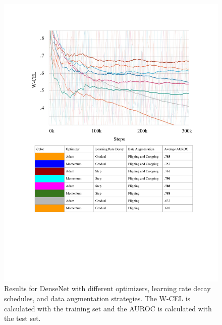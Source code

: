 \documentclass{article}
\begin{document}
\begin{figure}[p]
\vskip 0.2in
\begin{center}
\centerline{\includegraphics[width=\columnwidth]{figure_3A}}
\caption{Results for DenseNet with different optimizers, learning rate decay schedules, and data augmentation strategies.
The W-CEL is calculated with the training set and the AUROC is calculated with the test set.}
\label{figure 3:}
\end{center}
\vskip -0.2in
\end{figure}
\end{document}
